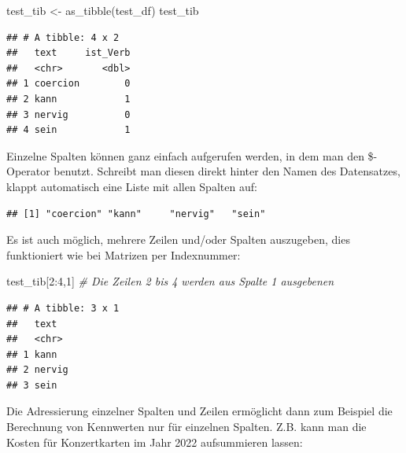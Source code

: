 \documentclass[
]{book}
\newenvironment{Shaded}{\begin{snugshade}}{\end{snugshade}}
\newcommand{\CommentTok}[1]{\textcolor[rgb]{0.56,0.35,0.01}{\textit{#1}}}
\newcommand{\DecValTok}[1]{\textcolor[rgb]{0.00,0.00,0.81}{#1}}
\newcommand{\FunctionTok}[1]{\textcolor[rgb]{0.00,0.00,0.00}{#1}}
\newcommand{\NormalTok}[1]{#1}
\newcommand{\OtherTok}[1]{\textcolor[rgb]{0.56,0.35,0.01}{#1}}
\newcommand{\SpecialCharTok}[1]{\textcolor[rgb]{0.00,0.00,0.00}{#1}}
\theoremstyle{definition}
\theoremstyle{definition}
\theoremstyle{definition}
\theoremstyle{definition}
\theoremstyle{remark}
\begin{document}
\begin{Shaded}
\begin{Highlighting}[]
\NormalTok{test\_tib }\OtherTok{\textless{}{-}} \FunctionTok{as\_tibble}\NormalTok{(test\_df)  }
\NormalTok{test\_tib}
\end{Highlighting}
\end{Shaded}

\begin{verbatim}
## # A tibble: 4 x 2
##   text     ist_Verb
##   <chr>       <dbl>
## 1 coercion        0
## 2 kann            1
## 3 nervig          0
## 4 sein            1
\end{verbatim}

Einzelne Spalten können ganz einfach aufgerufen werden, in dem man den \$-Operator benutzt. Schreibt man diesen direkt hinter den Namen des Datensatzes, klappt automatisch eine Liste mit allen Spalten auf:

\begin{Shaded}
\end{Shaded}

\begin{verbatim}
## [1] "coercion" "kann"     "nervig"   "sein"
\end{verbatim}

Es ist auch möglich, mehrere Zeilen und/oder Spalten auszugeben, dies funktioniert wie bei Matrizen per Indexnummer:

\begin{Shaded}
\begin{Highlighting}[]
\NormalTok{test\_tib[}\DecValTok{2}\SpecialCharTok{:}\DecValTok{4}\NormalTok{,}\DecValTok{1}\NormalTok{] }\CommentTok{\# Die Zeilen 2 bis 4 werden aus Spalte 1 ausgebenen}
\end{Highlighting}
\end{Shaded}

\begin{verbatim}
## # A tibble: 3 x 1
##   text  
##   <chr> 
## 1 kann  
## 2 nervig
## 3 sein
\end{verbatim}

Die Adressierung einzelner Spalten und Zeilen ermöglicht dann zum Beispiel die Berechnung von Kennwerten nur für einzelnen Spalten. Z.B. kann man die Kosten für Konzertkarten im Jahr 2022 aufsummieren lassen:
\end{document}
